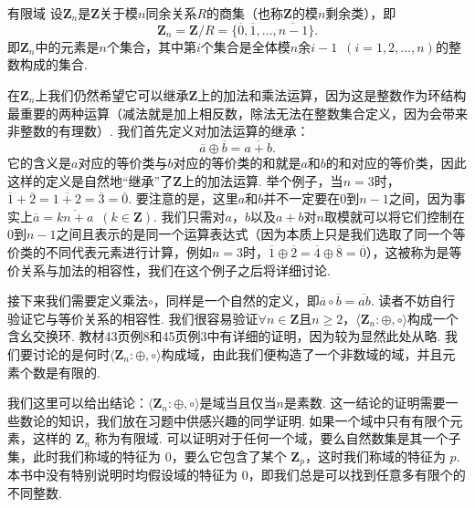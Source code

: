 \begin{example}{}{有限域}
    设$\mathbf{Z}_n$是$\mathbf{Z}$关于模$n$同余关系$R$的商集（也称$\mathbf{Z}$的模$n$剩余类），即
    \[\mathbf{Z}_n=\mathbf{Z}/R=\{\overline{0},\overline{1},\ldots,\overline{n-1}\}.\]
    即$\mathbf{Z}_n$中的元素是$n$个集合，其中第$i$个集合是全体模$n$余$i-1\enspace(i=1,2,\ldots,n)$的整数构成的集合.

    在$\mathbf{Z}_n$上我们仍然希望它可以继承$\mathbf{Z}$上的加法和乘法运算，因为这是整数作为环结构最重要的两种运算（减法就是加上相反数，除法无法在整数集合定义，因为会带来非整数的有理数）. 我们首先定义对加法运算的继承：
    \[\overline{a}\oplus\overline{b}=\overline{a+b}.\]
    它的含义是$a$对应的等价类与$b$对应的等价类的和就是$a$和$b$的和对应的等价类，因此这样的定义是自然地``继承''了$\mathbf{Z}$上的加法运算. 举个例子，当$n=3$时，$\overline{1}+\overline{2}=\overline{1+2}=\overline{3}=\overline{0}$. 要注意的是，这里$a$和$b$并不一定要在$0$到$n-1$之间，因为事实上$\overline{a}=\overline{kn+a}\enspace(k\in\mathbf{Z})$. 我们只需对$a$，$b$以及$a+b$对$n$取模就可以将它们控制在$0$到$n-1$之间且表示的是同一个运算表达式（因为本质上只是我们选取了同一个等价类的不同代表元素进行计算，例如$n=3$时，$\overline{1}\oplus\overline{2}=\overline{4}\oplus\overline{8}=\overline{0}$），这被称为是等价关系与加法的相容性，我们在这个例子之后将详细讨论.

    接下来我们需要定义乘法$\circ$，同样是一个自然的定义，即$\overline{a}\circ\overline{b}=\overline{ab}$. 读者不妨自行验证它与等价关系的相容性. 我们很容易验证$\forall n\in\mathbf{Z}$且$n\geqslant 2$，$\langle \mathbf{Z}_n\colon\oplus,\circ\rangle$构成一个含幺交换环. 教材43页例8和45页例3中有详细的证明，因为较为显然此处从略. 我们要讨论的是何时$\langle \mathbf{Z}_n\colon\oplus,\circ\rangle$构成域，由此我们便构造了一个非数域的域，并且元素个数是有限的.

    我们这里可以给出结论：$\langle \mathbf{Z}_n\colon\oplus,\circ\rangle$是域当且仅当$n$是素数. 这一结论的证明需要一些数论的知识，我们放在习题中供感兴趣的同学证明. 如果一个域中只有有限个元素，这样的 $\mathbf{Z}_n$ 称为有限域. 可以证明对于任何一个域，要么自然数集是其一个子集，此时我们称域的特征为 $0$，要么它包含了某个 $\mathbf{Z}_p$，这时我们称域的特征为 $p$. 本书中没有特别说明时均假设域的特征为 $0$，即我们总是可以找到任意多有限个的不同整数.
\end{example}

